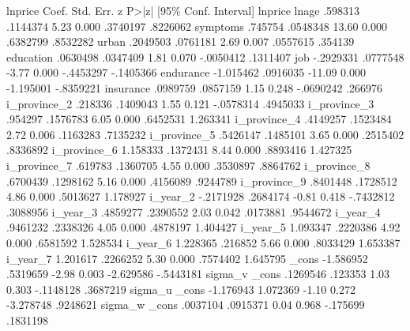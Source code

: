      lnprice {\VBAR}      Coef.   Std. Err.      z    P>|z|     [95\% Conf. Interval]
lnprice      {\VBAR}
       lnage {\VBAR}    .598313   .1144374     5.23   0.000     .3740197    .8226062
    symptoms {\VBAR}    .745754   .0548348    13.60   0.000     .6382799    .8532282
       urban {\VBAR}   .2049503   .0761181     2.69   0.007     .0557615     .354139
   education {\VBAR}   .0630498   .0347409     1.81   0.070    -.0050412    .1311407
         job {\VBAR}  -.2929331   .0777548    -3.77   0.000    -.4453297   -.1405366
   endurance {\VBAR}  -1.015462   .0916035   -11.09   0.000    -1.195001   -.8359221
   insurance {\VBAR}   .0989759   .0857159     1.15   0.248    -.0690242     .266976
i_province_2 {\VBAR}    .218336   .1409043     1.55   0.121    -.0578314    .4945033
i_province_3 {\VBAR}    .954297   .1576783     6.05   0.000     .6452531    1.263341
i_province_4 {\VBAR}   .4149257   .1523484     2.72   0.006     .1163283    .7135232
i_province_5 {\VBAR}   .5426147   .1485101     3.65   0.000     .2515402    .8336892
i_province_6 {\VBAR}   1.158333   .1372431     8.44   0.000     .8893416    1.427325
i_province_7 {\VBAR}    .619783   .1360705     4.55   0.000     .3530897    .8864762
i_province_8 {\VBAR}   .6700439   .1298162     5.16   0.000     .4156089    .9244789
i_province_9 {\VBAR}   .8401448   .1728512     4.86   0.000     .5013627    1.178927
    i_year_2 {\VBAR}  -.2171928   .2684174    -0.81   0.418    -.7432812    .3088956
    i_year_3 {\VBAR}   .4859277   .2390552     2.03   0.042     .0173881    .9544672
    i_year_4 {\VBAR}   .9461232   .2338326     4.05   0.000     .4878197    1.404427
    i_year_5 {\VBAR}   1.093347   .2220386     4.92   0.000     .6581592    1.528534
    i_year_6 {\VBAR}   1.228365    .216852     5.66   0.000     .8033429    1.653387
    i_year_7 {\VBAR}   1.201617   .2266252     5.30   0.000     .7574402    1.645795
       _cons {\VBAR}  -1.586952   .5319659    -2.98   0.003    -2.629586   -.5443181
sigma_v      {\VBAR}
       _cons {\VBAR}   .1269546    .123353     1.03   0.303    -.1148128    .3687219
sigma_u      {\VBAR}
       _cons {\VBAR}  -1.176943   1.072369    -1.10   0.272    -3.278748    .9248621
sigma_w      {\VBAR}
       _cons {\VBAR}   .0037104   .0915371     0.04   0.968     -.175699    .1831198
